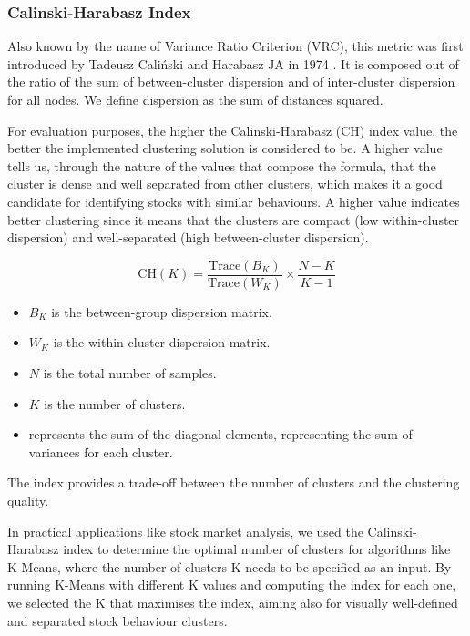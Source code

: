 \documentclass[11pt]{article}
\begin{document}
\subsubsection{Calinski-Harabasz Index}

Also known by the name of Variance Ratio Criterion (VRC), this metric was first introduced by Tadeusz Caliński and Harabasz JA in 1974 \cite{calinski}. It is composed out of the ratio of the sum of between-cluster dispersion and of inter-cluster dispersion for all nodes. We define dispersion as the sum of distances squared. 

For evaluation purposes, the higher the Calinski-Harabasz (CH) index value, the better the implemented clustering solution is considered to be. A higher value tells us, through the nature of the values that compose the formula, that the cluster is dense and well separated from other clusters, which makes it a good candidate for identifying stocks with similar behaviours. A higher value indicates better clustering since it means that the clusters are compact (low within-cluster dispersion) and well-separated (high between-cluster dispersion).

\begin{equation*}
\text{CH}(K) = \frac{\text{Trace}(B_K)}{\text{Trace}(W_K)} \times \frac{N - K}{K - 1}
\end{equation*}

\begin{itemize}
    \item \( B_K \) is the between-group dispersion matrix.
    \item \( W_K \) is the within-cluster dispersion matrix.
    \item \( N \) is the total number of samples.
    \item \( K \) is the number of clusters.
    \item {} represents the sum of the diagonal elements, representing the sum of variances for each cluster.
\end{itemize}

The index provides a trade-off between the number of clusters and the clustering quality. 

In practical applications like stock market analysis, we used the Calinski-Harabasz index to determine the optimal number of clusters for algorithms like K-Means, where the number of clusters K needs to be specified as an input. By running K-Means with different K values and computing the index for each one, we selected the K that maximises the index, aiming also for visually well-defined and separated stock behaviour clusters.
\end{document}
